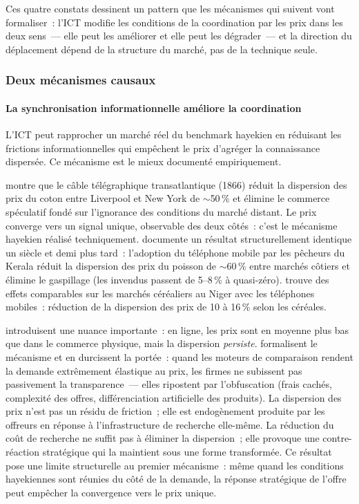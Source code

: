Ces quatre constats dessinent un pattern que les mécanismes qui suivent vont formaliser~: l'ICT modifie les conditions de la coordination par les prix dans les deux sens~--- elle peut les améliorer et elle peut les dégrader~--- et la direction du déplacement dépend de la structure du marché, pas de la technique seule.


\subsubsection{Deux mécanismes causaux}

\paragraph{La synchronisation informationnelle améliore la coordination}

L'ICT peut rapprocher un marché réel du benchmark hayekien en réduisant les frictions informationnelles qui empêchent le prix d'agréger la connaissance dispersée. Ce mécanisme est le mieux documenté empiriquement.

\textcite{steinwender_real_2018} montre que le câble télégraphique transatlantique (1866) réduit la dispersion des prix du coton entre Liverpool et New York de $\sim$50\,\% et élimine le commerce spéculatif fondé sur l'ignorance des conditions du marché distant. Le prix converge vers un signal unique, observable des deux côtés~: c'est le mécanisme hayekien réalisé techniquement. \textcite{jensen_digital_2007} documente un résultat structurellement identique un siècle et demi plus tard~: l'adoption du téléphone mobile par les pêcheurs du Kerala réduit la dispersion des prix du poisson de $\sim$60\,\% entre marchés côtiers et élimine le gaspillage (les invendus passent de 5--8\,\% à quasi-zéro). \textcite{aker_information_2010} trouve des effets comparables sur les marchés céréaliers au Niger avec les téléphones mobiles~: réduction de la dispersion des prix de 10 à 16\,\% selon les céréales.

\textcite{brynjolfsson_smith_2000} introduisent une nuance importante~: en ligne, les prix sont en moyenne plus bas que dans le commerce physique, mais la dispersion \emph{persiste}. \textcite{ellison_search_2009} formalisent le mécanisme et en durcissent la portée~: quand les moteurs de comparaison rendent la demande extrêmement élastique au prix, les firmes ne subissent pas passivement la transparence~--- elles ripostent par l'obfuscation (frais cachés, complexité des offres, différenciation artificielle des produits). La dispersion des prix n'est pas un résidu de friction~; elle est endogènement produite par les offreurs en réponse à l'infrastructure de recherche elle-même. La réduction du coût de recherche \parencite{goldfarb_digital_2019} ne suffit pas à éliminer la dispersion~; elle provoque une contre-réaction stratégique qui la maintient sous une forme transformée. Ce résultat pose une limite structurelle au premier mécanisme~: même quand les conditions hayekiennes sont réunies du côté de la demande, la réponse stratégique de l'offre peut empêcher la convergence vers le prix unique.

